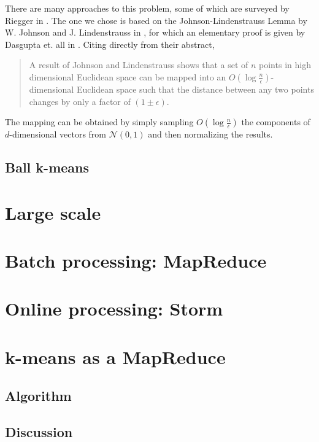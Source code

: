 \documentclass{article}
\begin{document}
There are many approaches to this problem, some of which are surveyed by Riegger
in \cite{Riegger2010}.
The one we chose is based on the Johnson-Lindenstrauss Lemma by W. Johnson and
J. Lindenstrauss in \cite{jl}, for which an
elementary proof is given by Dasgupta et. all in \cite{Dasgupta2003}. Citing
directly from their abstract,

\begin{quote}
    A result of Johnson and Lindenstrauss shows that a set of $n$ points in
    high dimensional Euclidean space can be mapped into an $O(\log
    \frac{n}{\epsilon})$-dimensional Euclidean space such that the distance
    between any two points changes by only a factor of $(1 \pm \epsilon)$.
\end{quote}

The mapping can be obtained by simply sampling $O(\log \frac{n}{\epsilon})$
the components of $d$-dimensional vectors from $\mathcal{N}(0, 1)$ and then
normalizing the results.

\subsection{Ball k-means}

\section{Large scale}

\section{Batch processing: MapReduce}

\section{Online processing: Storm}

\section{k-means as a MapReduce}

\subsection{Algorithm}

\subsection{Discussion}
\end{document}
